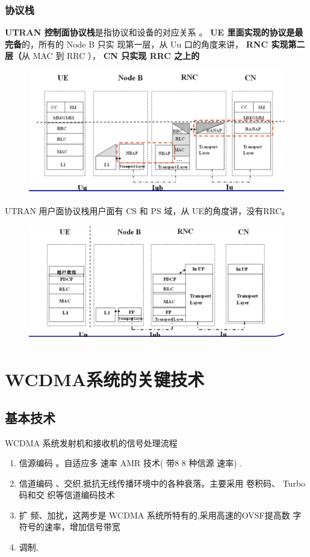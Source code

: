 \subsubsection{协议栈}
\textbf{UTRAN 控制面协议栈}是指协议和设备的对应关系
。 \textbf{UE 里面实现的协议是最完备}的，所有的 Node B 只实
现第一层，从 Uu 口的角度来讲，\textbf{ RNC 实现第二层（}从
MAC 到 RRC ），\textbf{ CN 只实现 RRC 之上的}
\begin{figure}
	\centering
	\includegraphics[width=0.7\linewidth]{figures/screenshot015}
	\caption{}
	\label{fig:screenshot015}
\end{figure}
UTRAN 用户面协议栈用户面有 CS 和 PS 域，从 UE的角度讲，没有RRC。
\begin{figure}
	\centering
	\includegraphics[width=0.7\linewidth]{figures/screenshot016}
	\caption{}
	\label{fig:screenshot016}
\end{figure}
\section{WCDMA系统的关键技术}
\subsection{基本技术}
WCDMA 系统发射机和接收机的信号处理流程
\begin{enumerate}
	\item 信源编码 。自适应多 速率 AMR
	技术( 带8 8 种信源 速率) .
	\item 信道编码 、交织,抵抗无线传播环境中的各种衰落。主要采用 卷积码、 Turbo 码和交
	织等信道编码技术
	\item 扩 频、加扰，这两步是 WCDMA 系统所特有的,采用高速的OVSF提高数
	字符号的速率，增加信号带宽
	\item 调制,
\end{enumerate}
